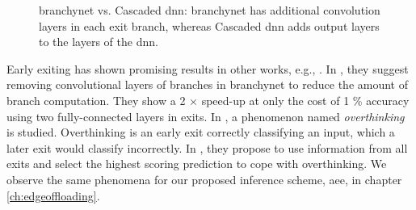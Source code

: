 \begin{figure}
	\hspace{2em}
	\caption[\gls{branchynet} vs. Cascaded \gls{dnn}]{\gls{branchynet} vs. Cascaded \gls{dnn}: \protect{} \gls{branchynet} has additional convolution layers in each exit branch, whereas \protect{} Cascaded \gls{dnn} adds output layers to the layers of the \gls{dnn}.}
	\label{fig:cascaded-vs-branchy}
\end{figure}

Early exiting has shown promising results in other works, e.g., \cite{kaya_shallow-deep_nodate, berestizshevsky_sacrificing_2019,panda_conditional_2016}. In \cite{berestizshevsky_sacrificing_2019}, they suggest removing convolutional layers of branches in \gls{branchynet} to reduce the amount of branch computation. They show a 2 $ \times $ speed-up at only the cost of 1 \% accuracy using two fully-connected layers in exits.
In \cite{kaya_shallow-deep_nodate},  a phenomenon named \emph{overthinking} is studied. Overthinking is an early exit correctly classifying an input, which a later exit would classify incorrectly. In \cite{kaya_shallow-deep_nodate}, they propose to use information from all exits and select the highest scoring prediction to cope with overthinking. We observe the same phenomena for our proposed inference scheme, \gls{aee}, in chapter \ref{ch:edgeoffloading}.

